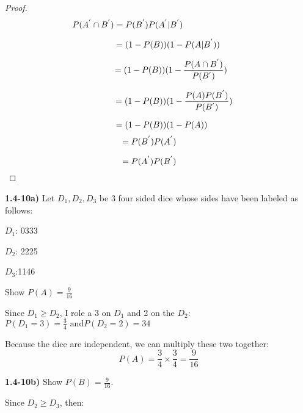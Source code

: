 \documentclass{article}
\begin{document}
\begin{proof}

$$\hspace{-1in}P(A^{'}\cap B^{'})=P(B^{'})P(A^{'} | B^{'})$$

$$\hspace{.3in}=(1-P(B))(1-P(A | B^{'}))$$


$$\hspace{.4in}=(1-P(B))(1-\frac{P(A\cap B^{'})}{P(B^{'})})$$

$$\hspace{.5in}=(1-P(B))(1-\frac{P(A) P(B^{'})}{P(B^{'})})$$

$$\hspace{.1in}=(1-P(B))(1-P(A))$$
$$\hspace{-.3in}=P(B^{'})P(A^{'})$$

$$\hspace{-.3in}=P(A^{'})P(B^{'})$$
\end{proof}

\newpage

\textbf{1.4-10a)} Let $D_{1}, D_{2}, D_{3}$ be 3 four sided dice whose sides have been labeled as follows: 
\vspace{2mm}

$D_{1}$: 0333
\vspace{2mm}

$D_{2}$: 2225

\vspace{2mm}
$D_{3}$:1146

\vspace{2mm}
Show $P(A)=\frac{9}{16}$

\vspace{2mm}



Since $D_{1} \ge D_{2}$,  I role a 3 on $D_{1}$ and 2 on the $D_{2}$: $P(D_{1}=3)=\frac{3}{4}\text{ and} P(D_{2}=2)={3}{4} $
\vspace{2mm}

Because the dice are independent, we can multiply these two together:
$$P(A)=\frac{3}{4} \times \frac{3}{4}=\frac{9}{16} $$
\vspace{2mm}


\textbf{1.4-10b)}  Show $P(B)=\frac{9}{16}$.
\vspace{2mm}

Since $D_{2} \ge D_{3}$, then:
\vspace{2mm}
 
\end{document}
